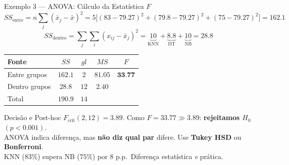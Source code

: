 \documentclass[aspectratio=169]{beamer}
\begin{document}
\begin{frame}[shrink=5]{Exemplo 3 — ANOVA: Cálculo da Estatística $F$}
    \footnotesize
    \[
      SS_{\text{entre}} = n\sum_{j}(\bar{x}_j-\bar{x})^2
        = 5\bigl[(83{-}79{.}27)^2 + (79{.}8{-}79{.}27)^2 + (75{-}79{.}27)^2\bigr] = 162{.}1
    \]
    \pause
    \[
      SS_{\text{dentro}} = \sum_j\sum_i(x_{ij}-\bar{x}_j)^2
        = \underbrace{10}_{\text{KNN}} + \underbrace{8{.}8}_{\text{DT}} + \underbrace{10}_{\text{NB}} = 28{.}8
    \]
    \pause
    \begin{center}\footnotesize
    \begin{tabular}{lcccc}
    \toprule
    Fonte & $SS$ & $gl$ & $MS$ & $F$ \\
    \midrule
    Entre grupos & $162{.}1$ & $2$ & $81{.}05$ & $\mathbf{33{.}77}$ \\
    Dentro grupos & $28{.}8$  & $12$ & $2{.}40$ & \\
    Total & $190{.}9$ & $14$ & & \\
    \bottomrule
    \end{tabular}
    \end{center}
    \pause
    \begin{alertblock}{Decisão e Post-hoc}
        \footnotesize $F_{\text{crit}}(2,12) = 3{.}89$. Como $F = 33{.}77 \gg 3{.}89$: \textbf{rejeitamos $H_0$} $(p < 0{.}001)$.\\
        ANOVA indica diferença, mas \textbf{não diz qual par} difere. Use \textbf{Tukey HSD} ou \textbf{Bonferroni}.\\
        KNN ($83\%$) supera NB ($75\%$) por 8 p.p.\ Diferença estatística \textit{e} prática.
    \end{alertblock}
\end{frame}
\end{document}
